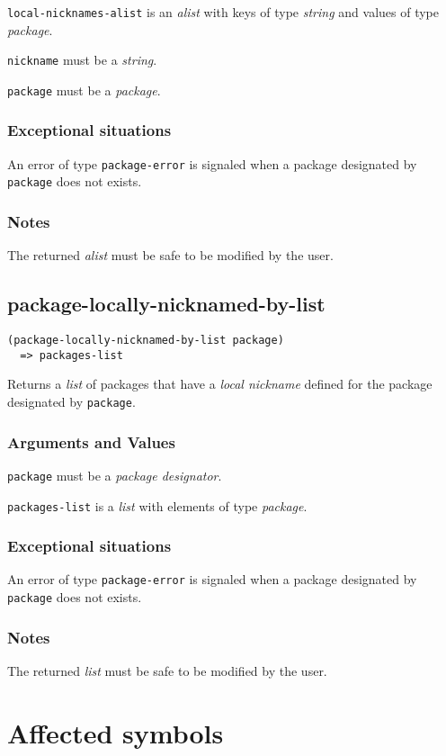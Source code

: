 \documentclass[11pt]{article}
\begin{document}
\texttt{local-nicknames-alist} is an \emph{alist} with keys of type \emph{string} and values of
type \emph{package}.

\texttt{nickname} must be a \emph{string}.

\texttt{package} must be a \emph{package}.
\subsubsection{Exceptional situations}
\label{sec:orge7dd968}
An error of type \texttt{package-error} is signaled when a package designated by
\texttt{package} does not exists.
\subsubsection{Notes}
\label{sec:org600a89c}
The returned \emph{alist} must be safe to be modified by the user.
\subsection{package-locally-nicknamed-by-list}
\label{sec:orgd8be019}
\begin{verbatim}
(package-locally-nicknamed-by-list package)
  => packages-list
\end{verbatim}

Returns a \emph{list} of packages that have a \emph{local nickname} defined for the package
designated by \texttt{package}.
\subsubsection{Arguments and Values}
\label{sec:org45b7e0b}
\texttt{package} must be a \emph{package designator}.

\texttt{packages-list} is a \emph{list} with elements of type \emph{package}.
\subsubsection{Exceptional situations}
\label{sec:orgaa3f6b7}
An error of type \texttt{package-error} is signaled when a package designated by
\texttt{package} does not exists.
\subsubsection{Notes}
\label{sec:org70d5ec0}
The returned \emph{list} must be safe to be modified by the user.
\section{Affected symbols}
\label{sec:orge95c77f}
\end{document}
